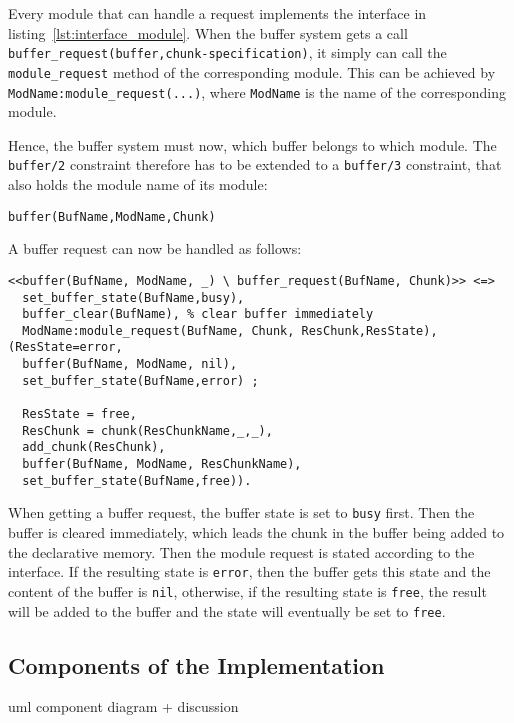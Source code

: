 Every module that can handle a request implements the interface in listing~\ref{lst:interface_module}. When the buffer system gets a call \verb|buffer_request(buffer,chunk-specification)|, it simply can call the \verb|module_request| method of the corresponding module. This can be achieved by \verb|ModName:module_request(...)|, where \verb|ModName| is the name of the corresponding module.

Hence, the buffer system must now, which buffer belongs to which module. The \verb|buffer/2| constraint therefore has to be extended to a \verb|buffer/3| constraint, that also holds the module name of its module:

\begin{lstlisting}
buffer(BufName,ModName,Chunk)
\end{lstlisting}

A buffer request can now be handled as follows:

\begin{lstlisting}[caption={Retrieval Request in CHR}, label=lst:retrieval_request_symbolic]
<<buffer(BufName, ModName, _) \ buffer_request(BufName, Chunk)>> <=>
  set_buffer_state(BufName,busy),
  buffer_clear(BufName), % clear buffer immediately
  ModName:module_request(BufName, Chunk, ResChunk,ResState),
(ResState=error, 
  buffer(BufName, ModName, nil),
  set_buffer_state(BufName,error) ;
  
  ResState = free,
  ResChunk = chunk(ResChunkName,_,_),
  add_chunk(ResChunk), 
  buffer(BufName, ModName, ResChunkName),
  set_buffer_state(BufName,free)).
\end{lstlisting}

When getting a buffer request, the buffer state is set to \verb|busy| first. Then the buffer is cleared immediately, which leads the chunk in the buffer being added to the declarative memory. Then the module request is stated according to the interface. If the resulting state is \verb|error|, then the buffer gets this state and the content of the buffer is \verb|nil|, otherwise, if the resulting state is \verb|free|, the result will be added to the buffer and the state will eventually be set to \verb|free|. 

\subsection{Components of the Implementation}

uml component diagram + discussion



